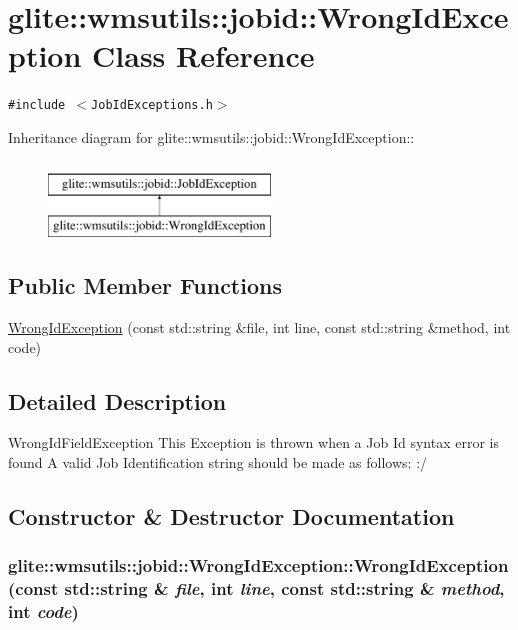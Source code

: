 \hypertarget{classglite_1_1wmsutils_1_1jobid_1_1WrongIdException}{
\section{glite::wmsutils::jobid::Wrong\-Id\-Exception Class Reference}
\label{classglite_1_1wmsutils_1_1jobid_1_1WrongIdException}
}
{\tt \#include $<$Job\-Id\-Exceptions.h$>$}

Inheritance diagram for glite::wmsutils::jobid::Wrong\-Id\-Exception::\begin{figure}[H]
\begin{center}
\leavevmode
\includegraphics[height=2cm]{classglite_1_1wmsutils_1_1jobid_1_1WrongIdException}
\end{center}
\end{figure}
\subsection*{Public Member Functions}
\begin{CompactItemize}
\item 
\hyperlink{classglite_1_1wmsutils_1_1jobid_1_1WrongIdException_a0}{Wrong\-Id\-Exception} (const std::string \&file, int line, const std::string \&method, int code)
\end{CompactItemize}


\subsection{Detailed Description}
Wrong\-Id\-Field\-Exception This Exception is thrown when a Job Id syntax error is found A valid Job Identification string should be made as follows: :/  



\subsection{Constructor \& Destructor Documentation}
\hypertarget{classglite_1_1wmsutils_1_1jobid_1_1WrongIdException_a0}{
\subsubsection[WrongIdException]{\setlength{\rightskip}{0pt plus 5cm}glite::wmsutils::jobid::Wrong\-Id\-Exception::Wrong\-Id\-Exception (const std::string \& {\em file}, int {\em line}, const std::string \& {\em method}, int {\em code})}}
\label{classglite_1_1wmsutils_1_1jobid_1_1WrongIdException_a0}


